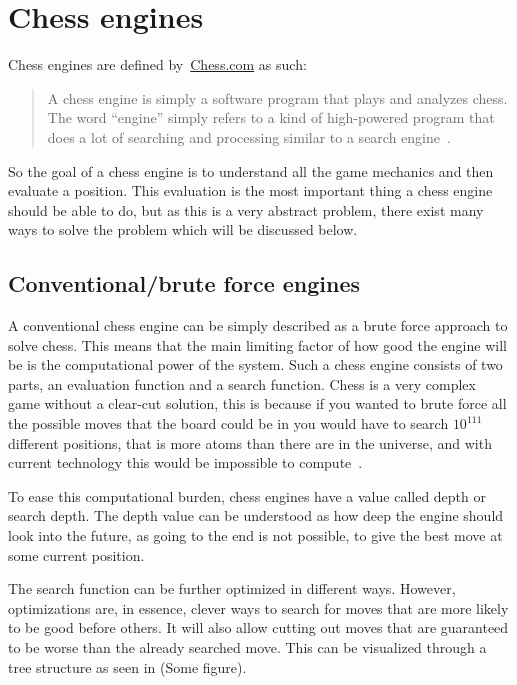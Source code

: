 \section{Chess engines}\label{sec:chess-engines}

Chess engines are defined by~\url{Chess.com} as such:

\begin{quote}
    A chess engine is simply a software program that plays and analyzes chess.
    The word “engine” simply refers to a kind of high-powered program that does a
    lot of searching and processing similar to a search engine~\cite{chess-com-chess-engines}.
\end{quote}

So the goal of a chess engine is to understand all the game mechanics and then evaluate a position.
This evaluation is the most important thing a chess engine should be able to do, but as this is a very abstract
problem, there exist many ways to solve the problem which will be discussed below.



\subsection{Conventional/brute force engines}\label{subsec:conventional-engines}

A conventional chess engine can be simply described as a brute force approach to solve chess.
This means that the main limiting factor of how good the engine will be is the computational power of the system.
Such a chess engine consists of two parts, an evaluation function and a search function.
Chess is a very complex game without a clear-cut solution, this is because if you wanted to brute force all the possible
moves that the board could be in you would have to search \( 10^{111} \) different positions, that is more atoms than
there are in the universe, and with current technology this would be impossible to compute~\cite{atoms}.

To ease this computational burden, chess engines have a value called depth or search depth.
The depth value can be understood as how deep the engine should look into the future, as going to the end is not
possible, to give the best move at some current position.

The search function can be further optimized in different ways.
However, optimizations are, in essence, clever ways to search for moves that are more likely to be good before others.
It will also allow cutting out moves that are guaranteed to be worse than the already searched move.
This can be visualized through a tree structure as seen in (Some figure).


